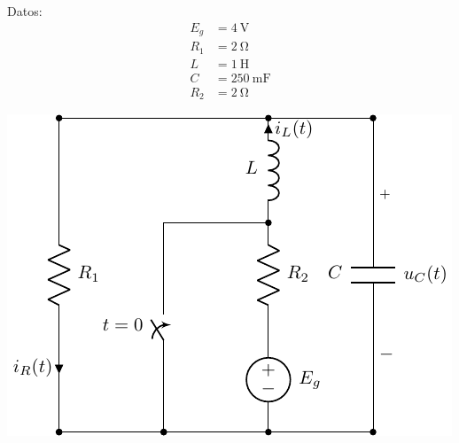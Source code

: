 \documentclass[12pt]{article}
\begin{document}
\begin{minipage}{0.3\textwidth}
Datos:
\begin{align*}
  E_g &= \SI{4}{\volt}\\
  R_1&= \SI{2}{\ohm}\\
  L &= \SI{1}{\henry}\\
  C &= \SI{250}{\milli\farad}\\
  R_2 &= \SI{2}{\ohm}
\end{align*}
\end{minipage}
\begin{minipage}{0.7\textwidth}
\includegraphics{figs/E2_circuito_v2.pdf}
\end{minipage}
\end{document}
